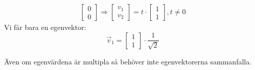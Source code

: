 \begin{Ex}
\begin{gather*}
		\begin{bmatrix} 0\\0 \end{bmatrix} \Rightarrow
		\begin{bmatrix} v_1\\v_2 \end{bmatrix} = 
		t \cdot \begin{bmatrix} 1\\1 \end{bmatrix} , t \neq 0
	\end{gather*}
	Vi får bara en egenvektor:
	\[
	\vec{v}_1 = \begin{bmatrix} 1\\1 \end{bmatrix} \cdot \frac{1}{\sqrt{2}}
	\]
\end{Ex}
Även om egenvärdena är multipla så behöver inte egenvektorerna sammanfalla.
